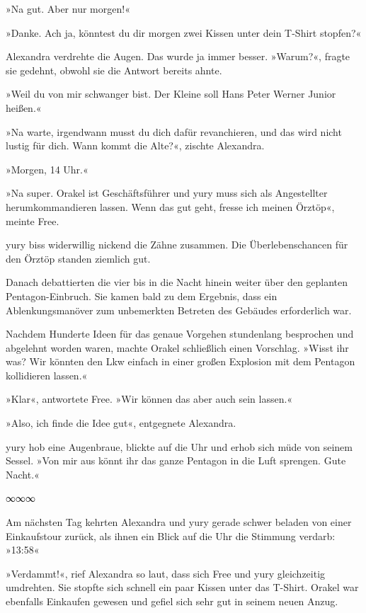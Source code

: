 »Na gut. Aber nur morgen!«

»Danke. Ach ja, könntest du dir morgen zwei Kissen unter dein T-Shirt stopfen?«

Alexandra verdrehte die Augen. Das wurde ja immer besser. »Warum?«, fragte sie gedehnt, obwohl sie die Antwort bereits ahnte.

»Weil du von mir schwanger bist. Der Kleine soll Hans Peter Werner Junior heißen.«

»Na warte, irgendwann musst du dich dafür revanchieren, und das wird nicht lustig für dich. Wann kommt die Alte?«, zischte Alexandra.

»Morgen, 14 Uhr.«

»Na super. Orakel ist Geschäftsführer und yury muss sich als Angestellter herumkommandieren lassen. Wenn das gut geht, fresse ich meinen Örztöp«, meinte Free.

yury biss widerwillig nickend die Zähne zusammen. Die Überlebenschancen für den Örztöp standen ziemlich gut.

Danach debattierten die vier bis in die Nacht hinein weiter über den geplanten Pentagon-Einbruch. Sie kamen bald zu dem Ergebnis, dass ein Ablenkungsmanöver zum unbemerkten Betreten des Gebäudes erforderlich war.

Nachdem Hunderte Ideen für das genaue Vorgehen stundenlang besprochen und abgelehnt worden waren, machte Orakel schließlich einen Vorschlag. »Wisst ihr was? Wir könnten den Lkw einfach in einer großen Explosion mit dem Pentagon kollidieren lassen.«

»Klar«, antwortete Free. »Wir können das aber auch sein lassen.«

»Also, ich finde die Idee gut«, entgegnete Alexandra.

yury hob eine Augenbraue, blickte auf die Uhr und erhob sich müde von seinem Sessel. »Von mir aus könnt ihr das ganze Pentagon in die Luft sprengen. Gute Nacht.«

\begin{center}
    ∞∞∞
\end{center}

Am nächsten Tag kehrten Alexandra und yury gerade schwer beladen von einer Einkaufstour zurück, als ihnen ein Blick auf die Uhr die Stimmung verdarb: »13:58«

»Verdammt!«, rief Alexandra so laut, dass sich Free und yury gleichzeitig umdrehten. Sie stopfte sich schnell ein paar Kissen unter das T-Shirt. Orakel war ebenfalls Einkaufen gewesen und gefiel sich sehr gut in seinem neuen Anzug.

